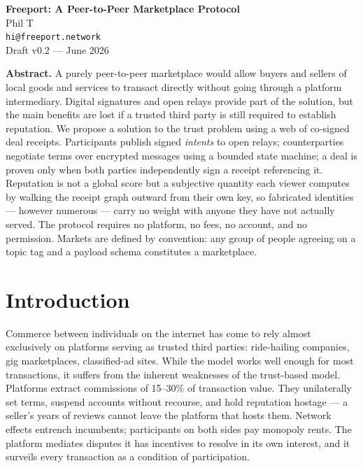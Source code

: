 \documentclass[11pt]{article}
\begin{document}
\begin{center}
{\Large\bfseries Freeport: A Peer-to-Peer Marketplace Protocol}\\[10pt]
{\normalsize Phil T}\\[2pt]
{\small\texttt{hi@freeport.network}}\\[8pt]
{\small Draft v0.2 --- June 2026}
\end{center}

\vspace{14pt}

\begin{center}
\begin{minipage}{0.88\textwidth}
\small
\textbf{Abstract.} A purely peer-to-peer marketplace would allow buyers and
sellers of local goods and services to transact directly without going
through a platform intermediary. Digital signatures and open relays provide
part of the solution, but the main benefits are lost if a trusted third
party is still required to establish reputation. We propose a solution to
the trust problem using a web of co-signed deal receipts. Participants
publish signed \emph{intents} to open relays; counterparties negotiate terms
over encrypted messages using a bounded state machine; a deal is proven only
when both parties independently sign a receipt referencing it. Reputation is
not a global score but a subjective quantity each viewer computes by walking
the receipt graph outward from their own key, so fabricated identities ---
however numerous --- carry no weight with anyone they have not actually
served. The protocol requires no platform, no fees, no account, and no
permission. Markets are defined by convention: any group of people agreeing
on a topic tag and a payload schema constitutes a marketplace.
\end{minipage}
\end{center}

\section{Introduction}

Commerce between individuals on the internet has come to rely almost
exclusively on platforms serving as trusted third parties: ride-hailing
companies, gig marketplaces, classified-ad sites. While the model works well
enough for most transactions, it suffers from the inherent weaknesses of the
trust-based model. Platforms extract commissions of 15--30\% of transaction
value. They unilaterally set terms, suspend accounts without recourse, and
hold reputation hostage --- a seller's years of reviews cannot leave the
platform that hosts them. Network effects entrench incumbents; participants
on both sides pay monopoly rents. The platform mediates disputes it has
incentives to resolve in its own interest, and it surveils every transaction
as a condition of participation.
\end{document}
